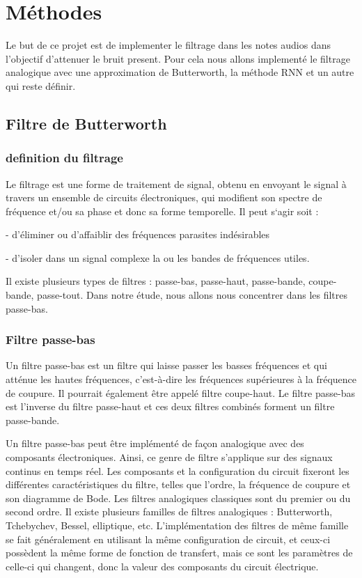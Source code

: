 \documentclass[conference,onecolumn]{IEEEtran}
\begin{document}
\clearpage
\section{Méthodes}
Le but de ce projet est de implementer le filtrage dans les notes audios dans l'objectif d'attenuer le bruit present. Pour cela nous allons implementé le filtrage analogique avec une approximation de Butterworth, la méthode RNN et un autre qui reste définir.

\subsection{\textbf{Filtre de Butterworth}}

\subsubsection{definition du filtrage}
\medskip
Le filtrage est une forme de traitement de signal, obtenu en envoyant le signal à travers un ensemble de circuits électroniques, qui modifient son spectre de fréquence et/ou sa phase et donc sa forme temporelle. Il peut s‘agir soit : 

 - d’éliminer ou d’affaiblir des fréquences parasites indésirables 

- d’isoler dans un signal complexe la ou les bandes de fréquences utiles. 

Il existe plusieurs types de filtres : passe-bas, passe-haut, passe-bande, coupe-bande, passe-tout. Dans notre étude, nous allons nous concentrer dans les filtres passe-bas.
\medskip
\subsubsection{Filtre passe-bas}
Un filtre passe-bas est un filtre qui laisse passer les basses fréquences et qui atténue les hautes fréquences, c'est-à-dire les fréquences supérieures à la fréquence de coupure. Il pourrait également être appelé filtre coupe-haut. Le filtre passe-bas est l'inverse du filtre passe-haut et ces deux filtres combinés forment un filtre passe-bande. 

Un filtre passe-bas peut être implémenté de façon analogique avec des composants électroniques. Ainsi, ce genre de filtre s'applique sur des signaux continus en temps réel. Les composants et la configuration du circuit fixeront les différentes caractéristiques du filtre, telles que l'ordre, la fréquence de coupure et son diagramme de Bode. Les filtres analogiques classiques sont du premier ou du second ordre. Il existe plusieurs familles de filtres analogiques : Butterworth, Tchebychev, Bessel, elliptique, etc. L'implémentation des filtres de même famille se fait généralement en utilisant la même configuration de circuit, et ceux-ci possèdent la même forme de fonction de transfert, mais ce sont les paramètres de celle-ci qui changent, donc la valeur des composants du circuit électrique.
\medskip
\end{document}
